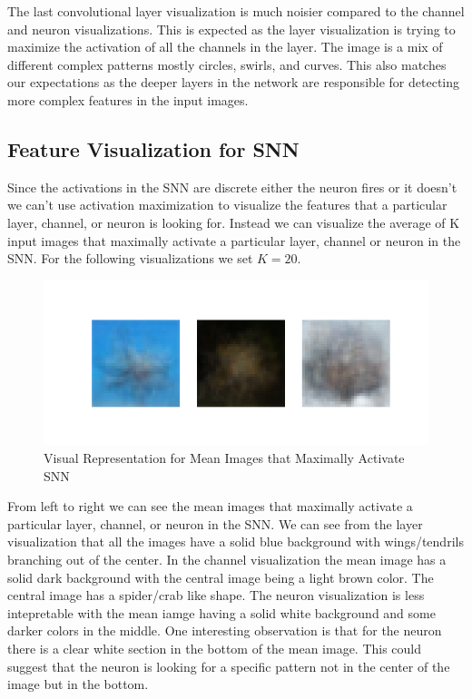\documentclass[12pt, letterpaper]{article}
\begin{document}
The last convolutional layer visualization is much noisier compared to the channel and neuron visualizations. This is expected as the layer visualization is trying to maximize the activation of all the channels in the layer. The image is a mix of different complex patterns mostly circles, swirls, and curves. This also matches our expectations as the deeper layers in the network are responsible for detecting more complex features in the input images.

\subsection{Feature Visualization for SNN}

Since the activations in the SNN are discrete either the neuron fires or it doesn't we can't use activation maximization to visualize the features that a particular layer, channel, or neuron is looking for. Instead we can visualize the average of K input images that maximally activate a particular layer, channel or neuron in the SNN. For the following visualizations we set $K = 20$.

\begin{figure}[H]
    \centering
    \includegraphics[width=1\textwidth]{snn_mean_images.png}
    \caption{Visual Representation for Mean Images that Maximally Activate SNN}
    \label{fig:snn_mean_images}
\end{figure}

From left to right we can see the mean images that maximally activate a particular layer, channel, or neuron in the SNN. We can see from the layer visualization that all the images have a solid blue background with wings/tendrils branching out of the center. In the channel visualization the mean image has a solid dark background with the central image being a light brown color. The central image has a spider/crab like shape. The neuron visualization is less intepretable with the mean iamge having a solid white background and some darker colors in the middle. One interesting observation is that for the neuron there is a clear white section in the bottom of the mean image. This could suggest that the neuron is looking for a specific pattern not in the center of the image but in the bottom.
\end{document}
